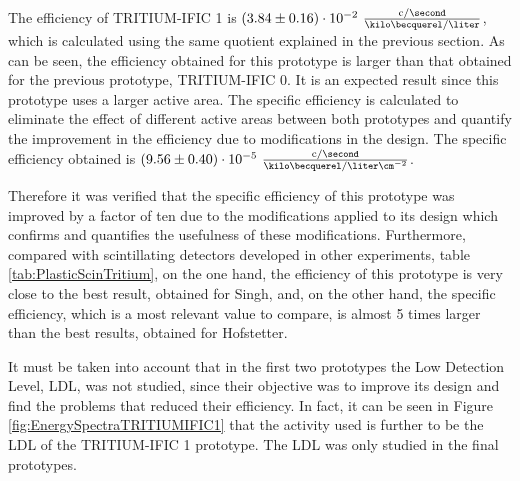 The efficiency of TRITIUM-IFIC 1 is $(3.84 \pm 0.16)\cdot{} 10^{-2}~ \frac{\text{c}/\second}{\kilo\becquerel/\liter}$, which is calculated using the same quotient explained in the previous section. As can be seen, the efficiency obtained for this prototype is larger than that obtained for the previous prototype, TRITIUM-IFIC 0. It is an expected result since this prototype uses a larger active area. The specific efficiency is calculated to eliminate the effect of different active areas between both prototypes and quantify the improvement in the efficiency due to modifications in the design. The specific efficiency obtained is $(9.56 \pm 0.40)\cdot{} 10^{-5}~ \frac{\text{c}/\second}{\kilo\becquerel/\liter\cm^{-2}}$.

Therefore it was verified that the specific efficiency of this prototype was improved by a factor of ten due to the modifications applied to its design which confirms and quantifies the usefulness of these modifications. Furthermore, compared with scintillating detectors developed in other experiments, table \ref{tab:PlasticScinTritium}, on the one hand, the efficiency of this prototype is very close to the best result, obtained for Singh, and, on the other hand, the specific efficiency, which is a most relevant value to compare, is almost 5 times larger than the best results, obtained for Hofstetter.

It must be taken into account that in the first two prototypes the Low Detection Level, LDL, was not studied, since their objective was to improve its design and find the problems that reduced their efficiency. In fact, it can be seen in Figure \ref{fig:EnergySpectraTRITIUMIFIC1} that the activity used is further to be the LDL of the TRITIUM-IFIC 1 prototype. The LDL was only studied in the final prototypes.


